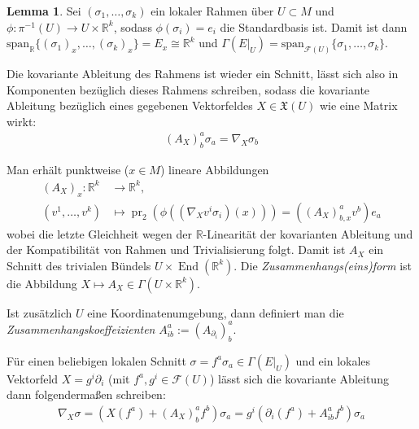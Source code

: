 \documentclass[a4paper]{scrreprt}
\numberwithin{equation}{chapter}
\DeclareMathOperator{\End}{End}
\DeclareMathOperator{\pr}{pr}
\newcommand{\R}{\mathbb{R}}
\newcommand{\sm}{\mathcal{F}}
\newcommand{\vf}{\mathfrak{X}}
\theoremstyle{definition}
\newtheorem{lemma}[defn]{Lemma}
\begin{document}
		\begin{lemma}
			Sei $(\sigma_1,\ldots,\sigma_k)$ ein lokaler Rahmen über $U\subset M$ und $\phi\colon\pi^{-1}(U)\rightarrow U\times \R^k$, sodass $\phi(\sigma_i)=e_i$ die Standardbasis ist. Damit ist dann $\mathrm{span}_{\R}\lbrace (\sigma_1)_x, \ldots,(\sigma_k)_x\rbrace=E_x\cong\R^k$ und $\Gamma(E\vert_U)=\mathrm{span}_{\sm(U)}\lbrace \sigma_1,\ldots,\sigma_k\rbrace$.
			
			Die kovariante Ableitung des Rahmens ist wieder ein Schnitt, lässt sich also in Komponenten bezüglich dieses Rahmens schreiben, sodass die kovariante Ableitung bezüglich eines gegebenen Vektorfeldes $X\in\vf(U)$ wie eine Matrix wirkt:
			\begin{align*}
				(A_X)^a_b\sigma_a=\nabla_X\sigma_b
			\end{align*}
			
			Man erhält punktweise ($x\in M$) lineare Abbildungen
			\begin{align*}
				(A_X)_x\colon\R^k&\rightarrow\R^k,\\
				(v^1,\ldots,v^k)&\mapsto \pr_2(\phi((\nabla_X v^i\sigma_i)(x)))=((A_X)_{b,x}^av^b)e_a
			\end{align*}
			wobei die letzte Gleichheit wegen der $\R$-Linearität der kovarianten Ableitung und der Kompatibilität von Rahmen und Trivialisierung folgt. Damit ist $A_X$ ein Schnitt des trivialen Bündels $U\times \End(\R^k)$. Die \emph{Zusammenhangs(eins)form} ist die Abbildung $X\mapsto A_X\in\Gamma(U\times \R^k)$.
			
			Ist zusätzlich $U$ eine Koordinatenumgebung, dann definiert man die \emph{Zusammenhangskoeffeizienten} $A_{ib}^a:=(A_{\partial_i})^a_b$.
			
			Für einen beliebigen lokalen Schnitt $\sigma=f^a\sigma_a\in\Gamma(E\vert_U)$ und ein lokales Vektorfeld $X=g^i\partial_i$ (mit $f^a,g^i\in\sm(U)$) lässt sich die kovariante Ableitung dann folgendermaßen schreiben:
			\begin{align*}
				\nabla_X\sigma=\left( X(f^a)+(A_X)^a_bf^b\right)\sigma_a=g^i\left( \partial_i(f^a)+A^a_{ib}f^b\right)\sigma_a
			\end{align*}
			

\end{lemma}
\end{document}
